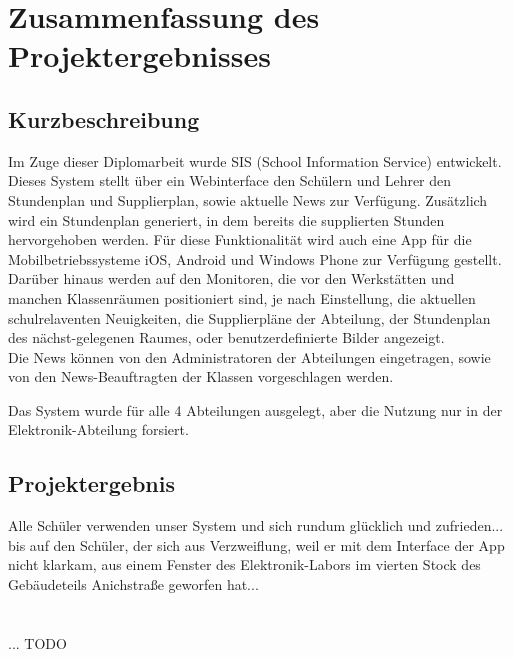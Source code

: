\chapter[Zusammenfassung]{Zusammenfassung des Projektergebnisses}

\section{Kurzbeschreibung}
Im Zuge dieser Diplomarbeit wurde SIS (School Information Service) entwickelt. \\
Dieses System stellt über ein Webinterface den Schülern und Lehrer den Stundenplan und Supplierplan, sowie aktuelle News zur Verfügung. Zusätzlich wird ein Stundenplan generiert, in dem bereits die supplierten Stunden hervorgehoben werden.
Für diese Funktionalität wird auch eine App für die Mobilbetriebssysteme iOS, Android und Windows Phone zur Verfügung gestellt.
Darüber hinaus werden auf den Monitoren, die vor den Werkstätten und manchen Klassenräumen positioniert sind, je nach Einstellung, die aktuellen schulrelaventen Neuigkeiten, die Supplierpläne der Abteilung, der Stundenplan des nächst-gelegenen Raumes, oder benutzerdefinierte Bilder angezeigt.\\
Die News können von den Administratoren der Abteilungen eingetragen, sowie von den News-Beauftragten der Klassen vorgeschlagen werden.


Das System wurde für alle 4 Abteilungen ausgelegt, aber die Nutzung nur in der Elektronik-Abteilung forsiert.

\section{Projektergebnis}
Alle Schüler verwenden unser System und sich rundum glücklich und zufrieden... bis auf den Schüler, der sich aus Verzweiflung, weil er mit dem Interface der App nicht klarkam, aus einem Fenster des Elektronik-Labors im vierten Stock des Gebäudeteils Anichstraße geworfen hat...\\
\\
\\... TODO